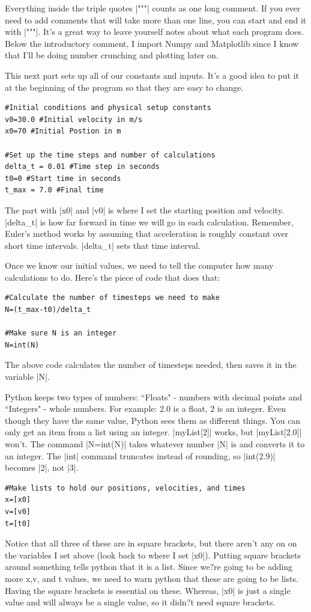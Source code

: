 \documentclass{book}
\begin{document}
Everything inside the triple quotes |"""| counts as one long comment.  If you ever need to add comments that will take more than one line, you can start and end it with |"""|.  It's a great way to leave yourself notes about what each program does.
Below the introductory comment, I import Numpy and Matplotlib since I know that I'll be doing number crunching and plotting later on.

This next part sets up all of our constants and inputs.  It's a good idea to put it at the beginning of the program so that they are easy to change.
\begin{lstlisting}
#Initial conditions and physical setup constants
v0=30.0 #Initial velocity in m/s
x0=70 #Initial Postion in m

#Set up the time steps and number of calculations
delta_t = 0.01 #Time step in seconds
t0=0 #Start time in seconds
t_max = 7.0 #Final time

\end{lstlisting}

The part with |x0| and |v0| is where I set the starting position and velocity.  |delta_t| is how far forward in time we will go in each calculation.  Remember, Euler's method works by assuming that acceleration is roughly constant over short time intervals.  |delta_t| sets that time interval.

Once we know our initial values, we need to tell the computer how many calculations to do.  Here's the piece of code that does that:

\begin{lstlisting}
#Calculate the number of timesteps we need to make
N=(t_max-t0)/delta_t

#Make sure N is an integer
N=int(N)
\end{lstlisting}

The above code calculates the number of timesteps needed, then saves it in the variable |N|. 

Python keeps two types of numbers: ``Floats" - numbers with decimal points and ``Integers" - whole numbers. For example: 2.0 is a float, 2 is an integer.  Even though they have the same value, Python sees them as different things.
You can only get an item from a list using an integer.
|myList[2]| works, but |myList[2.0]| won't.  The command |N=int(N)| takes whatever number |N| is and converts it to an integer.  The |int| command truncates instead of rounding, so |int(2.9)| becomes |2|, not |3|.

\begin{lstlisting}
#Make lists to hold our positions, velocities, and times
x=[x0]
v=[v0]
t=[t0]

\end{lstlisting}
Notice that all three of these are in square brackets, but there aren't any on on the variables I set above (look back to where I set |x0|).  
Putting square brackets around something tells python that it is a list.  Since we?re going to be adding more x,v, and t values, we need to warn python that these are going to be lists.
Having the square brackets is essential on these. Whereas, |x0| is just a single value and will always be a single value, so it didn?t need square brackets.
\end{document}
